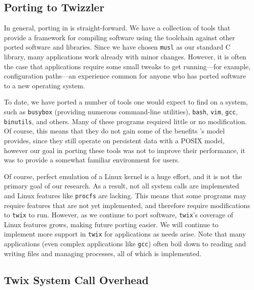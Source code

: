 \subsection{Porting to Twizzler}

In general, porting in \Twizzler is straight-forward. We have a collection of tools that provide a
framework for compiling software using the \Twizzler toolchain against other ported software and
libraries. Since we have chosen \texttt{musl} as our standard C library, many applications work
already with minor changes. However, it is often the case that applications require
some small tweaks to get running---for example, configuration paths---an experience common for anyone who has ported software to a new
operating system.

To date, we have ported a number of tools one would expect to find on a \unix system, such as
\texttt{busybox} (providing numerous command-line utilities), \texttt{bash}, \texttt{vim},
\texttt{gcc}, \texttt{binutils}, and others. Many of these programs required little or no
modification. Of course, this means that they do not gain some of the benefits \Twizzler's model
provides, since they still operate on persistent data with a POSIX model, however our goal in
porting these tools was not to improve their performance, it was to provide a somewhat familiar
environment for users.

Of course, perfect emulation of a Linux kernel is a huge effort, and it is not the primary goal of
our research. As a result, not all system calls are implemented and Linux features like
\texttt{procfs} are lacking. This means that some programs may require features that are not yet
implemented, and therefore require modifications to \texttt{twix} to run. However, as we continue to
port software, \texttt{twix}'s coverage of Linux features grows, making future porting easier. We
will continue to implement more support in \texttt{twix} for applications as needs arise. Note that
many applications (even complex applications like \texttt{gcc}) often boil down to reading and
writing files and managing processes, all of which is implemented.

\subsection{Twix System Call Overhead}

